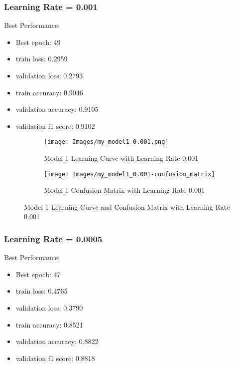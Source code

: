 \documentclass{article}
\begin{document}
\subsubsection{Learning Rate = 0.001}
Best Performance:
\begin{itemize}
    \item Best epoch: 49
    \item train loss: 0.2959
    \item validation loss: 0.2793
    \item train accuracy: 0.9046
    \item validation accuracy: 0.9105
    \item validation f1 score: 0.9102
\end{itemize}

\begin{figure}[h]
    \begin{subfigure}{0.5\textwidth}
        \texttt{[image: Images/my\_model1\_0.001.png]} 
        \caption{Model 1 Learning Curve with Learning Rate 0.001}
        \label{fig:model1_lr_0.001}
    \end{subfigure}
    \begin{subfigure}{0.5\textwidth}
        \texttt{[image: Images/my\_model1\_0.001-confusion\_matrix]} 
        \caption{Model 1 Confusion Matrix with Learning Rate 0.001}
        \label{fig:model1_lr_0.001_confusion_matrix}
    \end{subfigure}
    \caption{Model 1 Learning Curve and Confusion Matrix with Learning Rate 0.001}
    \label{fig:model1_lr_0.001_combined}
\end{figure}

\subsubsection{Learning Rate = 0.0005}
Best Performance:
\begin{itemize}
    \item Best epoch: 47
    \item train loss: 0.4765
    \item validation loss: 0.3790
    \item train accuracy: 0.8521
    \item validation accuracy: 0.8822
    \item validation f1 score: 0.8818
\end{itemize}
\end{document}
